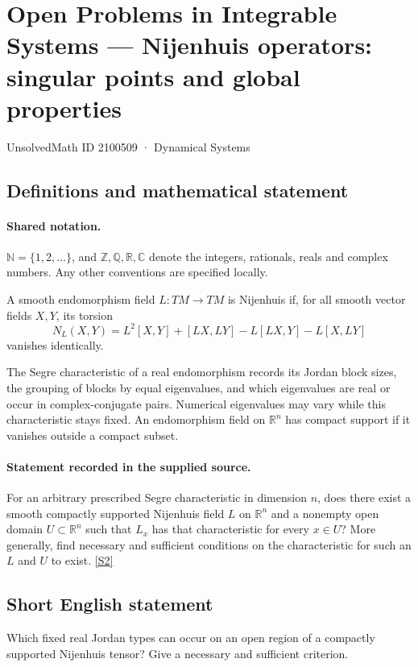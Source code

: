 \documentclass[11pt]{article}
\newcommand{\sref}[2]{\hyperlink{source:#1:#2}{[S#2]}}
\begin{document}
\setcounter{section}{2100508}
\section{Open Problems in Integrable Systems — Nijenhuis operators: singular points and global properties}\label{2100509}
{\small\sffamily UnsolvedMath ID 2100509 · Dynamical Systems}
\subsection{Definitions and mathematical statement}

\paragraph{Shared notation.}$\mathbb N=\{1,2,\ldots\}$, and $\mathbb Z,\mathbb Q,\mathbb R,\mathbb C$ denote the integers, rationals, reals and complex numbers. Any other conventions are specified locally.


A smooth endomorphism field $L:TM\to TM$ is Nijenhuis if, for all smooth vector fields $X,Y$, its torsion
\[N_L(X,Y)=L^2[X,Y]+[LX,LY]-L[LX,Y]-L[X,LY]\]
vanishes identically.\par The Segre characteristic of a real endomorphism records its Jordan block sizes, the grouping of blocks by equal eigenvalues, and which eigenvalues are real or occur in complex-conjugate pairs. Numerical eigenvalues may vary while this characteristic stays fixed. An endomorphism field on $\mathbb R^n$ has compact support if it vanishes outside a compact subset.
\paragraph{Statement recorded in the supplied source.}
For an arbitrary prescribed Segre characteristic in dimension $n$, does there exist a smooth compactly supported Nijenhuis field $L$ on $\mathbb R^n$ and a nonempty open domain $U\subset\mathbb R^n$ such that $L_x$ has that characteristic for every $x\in U$? More generally, find necessary and sufficient conditions on the characteristic for such an $L$ and $U$ to exist. \sref{2100509}{2}
\subsection{Short English statement}
Which fixed real Jordan types can occur on an open region of a compactly supported Nijenhuis tensor? Give a necessary and sufficient criterion.
\end{document}

